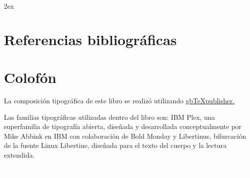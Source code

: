 \backmatter

\ifPDF
\printnoidxglossary[type=\acronymtype,title={Índice de siglas}]
\printnoidxglossary[title={Glosario de términos}]
\printbibliography[heading=none,heading=bibintoc]
\printindex[names]
\printindex[concepto]
\printindex[onomastico]
	\else
	\ifBLACKPDF
		\printnoidxglossary[type=\acronymtype,title={Índice de siglas}]
		\printnoidxglossary[title={Glosario de términos}]
		\printbibliography[heading=none,heading=bibintoc]
	\printindex[names]
	\printindex[concepto]
	\printindex[onomastico]
		\else
	 	\ifEPUB
	 	\begingroup
	 	\parindent 0pt
	 	\parskip 2ex
	 	\def\enotesize{\normalsize}
	 	\theendnotes
	 	\endgroup
	 	\printnoidxglossary[type=\acronymtype,title={Índice de siglas}]
	 	\printnoidxglossary[title={Glosario de términos}]
	 	\chapter{Referencias bibliográficas}
	 	\printbibliography[heading=none]
	 		\else
	 		\ifHTML
	 		\ForceHTMLPage
	 		\printnoidxglossary[title={Índice de siglas},type=\acronymtype]
	 		\ForceHTMLPage
	 		\printnoidxglossary[title={Glosario de términos}]
	 		\ForceHTMLPage
	 		\printbibliography[heading=bibintoc]
	 			\else
	 			\ifODT
	 			\printnoidxglossary[type=\acronymtype,title={Índice de siglas}]
	 			\printnoidxglossary[title={Glosario de términos}]
	 			\printbibliography[heading=none,heading=bibintoc]
	 			\fi
	 		\fi
		\fi
	\fi
\fi



\chapter{Colofón}

La composición tipográfica de este libro se realizó utilizando \href{https://github.com/albertomoyano/gbtexpublisher}{gbTeXpublisher.}

Las familias tipográficas utilizadas dentro del libro son: IBM Plex, una superfamilia de tipografía abierta, diseñada y desarrollada conceptualmente por Mike Abbink en IBM con colaboración de Bold Monday y Libertinus, bifurcación de la fuente Linux Libertine, diseñada para el texto del cuerpo y la lectura extendida.

\ifPDF
\newpage
\thispagestyle{empty}
{\textcolor{white}{.}}
	\else
	\ifBLACKPDF
	\newpage
	\thispagestyle{empty}
	{\textcolor{white}{.}}
	\fi
\fi





